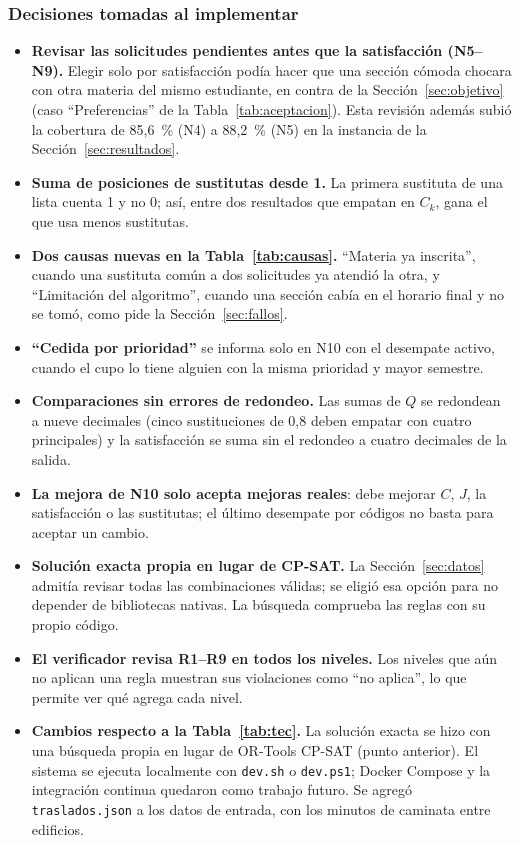 \subsubsection{Decisiones tomadas al implementar}\label{sec:decisiones}

\begin{itemize}
\item \textbf{Revisar las solicitudes pendientes antes que la satisfacción (N5--N9).} Elegir solo por satisfacción podía hacer que una sección cómoda chocara con otra materia del mismo estudiante, en contra de la Sección~\ref{sec:objetivo} (caso ``Preferencias'' de la Tabla~\ref{tab:aceptacion}). Esta revisión además subió la cobertura de 85,6~\% (N4) a 88,2~\% (N5) en la instancia de la Sección~\ref{sec:resultados}.
\item \textbf{Suma de posiciones de sustitutas desde 1.} La primera sustituta de una lista cuenta 1 y no 0; así, entre dos resultados que empatan en $C_k$, gana el que usa menos sustitutas.
\item \textbf{Dos causas nuevas en la Tabla~\ref{tab:causas}.} ``Materia ya inscrita'', cuando una sustituta común a dos solicitudes ya atendió la otra, y ``Limitación del algoritmo'', cuando una sección cabía en el horario final y no se tomó, como pide la Sección~\ref{sec:fallos}.
\item \textbf{``Cedida por prioridad''} se informa solo en N10 con el desempate activo, cuando el cupo lo tiene alguien con la misma prioridad y mayor semestre.
\item \textbf{Comparaciones sin errores de redondeo.} Las sumas de $Q$ se redondean a nueve decimales (cinco sustituciones de 0,8 deben empatar con cuatro principales) y la satisfacción se suma sin el redondeo a cuatro decimales de la salida.
\item \textbf{La mejora de N10 solo acepta mejoras reales}: debe mejorar $C$, $J$, la satisfacción o las sustitutas; el último desempate por códigos no basta para aceptar un cambio.
\item \textbf{Solución exacta propia en lugar de CP-SAT.} La Sección~\ref{sec:datos} admitía revisar todas las combinaciones válidas; se eligió esa opción para no depender de bibliotecas nativas. La búsqueda comprueba las reglas con su propio código.
\item \textbf{El verificador revisa R1--R9 en todos los niveles.} Los niveles que aún no aplican una regla muestran sus violaciones como ``no aplica'', lo que permite ver qué agrega cada nivel.
\item \textbf{Cambios respecto a la Tabla~\ref{tab:tec}.} La solución exacta se hizo con una búsqueda propia en lugar de OR-Tools CP-SAT (punto anterior). El sistema se ejecuta localmente con \texttt{dev.sh} o \texttt{dev.ps1}; Docker Compose y la integración continua quedaron como trabajo futuro. Se agregó \texttt{traslados.json} a los datos de entrada, con los minutos de caminata entre edificios.
\end{itemize}

